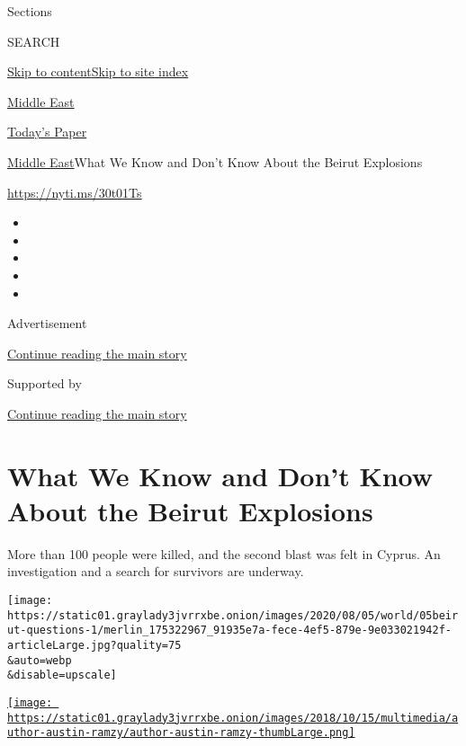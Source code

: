 Sections

SEARCH

\protect\hyperlink{site-content}{Skip to
content}\protect\hyperlink{site-index}{Skip to site index}

\href{https://www.nytimes3xbfgragh.onion/section/world/middleeast}{Middle
East}

\href{https://myaccount.nytimes3xbfgragh.onion/auth/login?response_type=cookie\&client_id=vi}{}

\href{https://www.nytimes3xbfgragh.onion/section/todayspaper}{Today's
Paper}

\href{/section/world/middleeast}{Middle East}\textbar{}What We Know and
Don't Know About the Beirut Explosions

\url{https://nyti.ms/30t01Ts}

\begin{itemize}
\item
\item
\item
\item
\item
\end{itemize}

Advertisement

\protect\hyperlink{after-top}{Continue reading the main story}

Supported by

\protect\hyperlink{after-sponsor}{Continue reading the main story}

\hypertarget{what-we-know-and-dont-know-about-the-beirut-explosions}{%
\section{What We Know and Don't Know About the Beirut
Explosions}\label{what-we-know-and-dont-know-about-the-beirut-explosions}}

More than 100 people were killed, and the second blast was felt in
Cyprus. An investigation and a search for survivors are underway.

\texttt{[image: https://static01.graylady3jvrrxbe.onion/images/2020/08/05/world/05beirut-questions-1/merlin\_175322967\_91935e7a-fece-4ef5-879e-9e033021942f-articleLarge.jpg?quality=75\\\&auto=webp\\\&disable=upscale]}

\href{https://www.nytimes3xbfgragh.onion/by/austin-ramzy}{\texttt{[image: https://static01.graylady3jvrrxbe.onion/images/2018/10/15/multimedia/author-austin-ramzy/author-austin-ramzy-thumbLarge.png]}}

